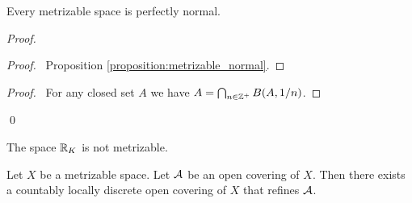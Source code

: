 \begin{proposition}
    Every metrizable space is perfectly normal.
\end{proposition}

\begin{proof}
    \pf
    \begin{proof}
        \pf\ Proposition \ref{proposition:metrizable_normal}.
    \end{proof}
    \begin{proof}
        \pf\ For any closed set $A$ we have $A = \bigcap_{n \in \ZZ^+}
        B(A,1/n)$.
    \end{proof}
    \qed
\end{proof}

\begin{corollary}
    The space $\RR_K$ is not metrizable.
\end{corollary}

\begin{proposition}[Choice]
    \label{proposition:countably_locally_discrete_refinement}
    Let $X$ be a metrizable space. Let $\AA$ be an open covering of $X$.
    Then there exists a countably locally discrete open covering of $X$ that refines $\AA$.
\end{proposition}


